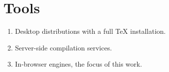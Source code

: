 \section{Tools}
\begin{enumerate}[noitemsep]
  \item Desktop distributions with a full TeX installation.
  \item Server-side compilation services.
  \item In-browser engines, the focus of this work.
\end{enumerate}
